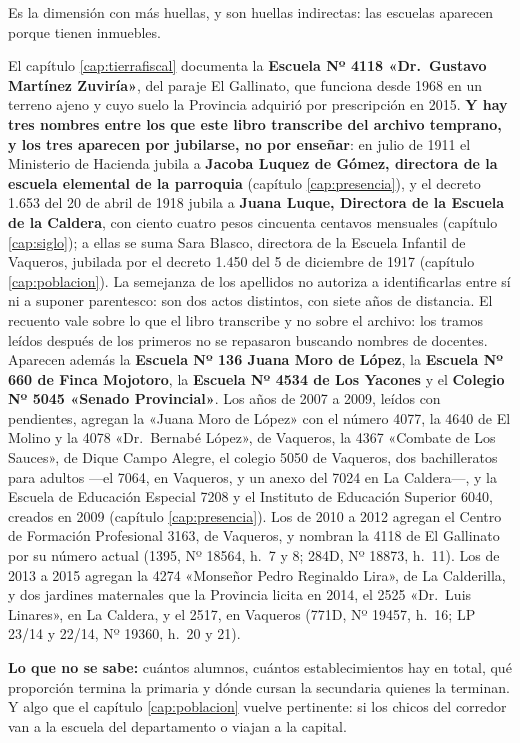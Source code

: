 Es la dimensión con más huellas, y son huellas indirectas: las escuelas aparecen porque tienen
inmuebles.

El capítulo \ref{cap:tierrafiscal} documenta la \textbf{Escuela Nº 4118 «Dr.\ Gustavo Martínez
Zuviría»}, del paraje El Gallinato, que funciona desde 1968 en un terreno ajeno y cuyo suelo la
Provincia adquirió por prescripción en 2015. \textbf{Y hay tres nombres entre los que este libro transcribe del archivo temprano, y los tres aparecen por jubilarse, no por enseñar}: en julio de 1911 el Ministerio de Hacienda jubila a \textbf{Jacoba Luquez de Gómez, directora de la escuela elemental de la parroquia} (capítulo \ref{cap:presencia}), y el decreto 1.653 del 20 de abril de 1918 jubila a \textbf{Juana Luque, Directora de la Escuela de la Caldera}, con ciento cuatro pesos cincuenta centavos mensuales (capítulo \ref{cap:siglo}); a ellas se suma Sara Blasco, directora de la Escuela Infantil de Vaqueros, jubilada por el decreto 1.450 del 5 de diciembre de 1917 (capítulo \ref{cap:poblacion}). La semejanza de los apellidos no autoriza a identificarlas entre sí ni a suponer parentesco: son dos actos distintos, con siete años de distancia. El recuento vale sobre lo que el libro transcribe y no sobre el archivo: los tramos leídos después de los primeros no se repasaron buscando nombres de docentes. Aparecen además la \textbf{Escuela Nº 136 Juana
Moro de López}, la \textbf{Escuela Nº 660 de Finca Mojotoro}, la \textbf{Escuela Nº 4534 de Los Yacones} y el \textbf{Colegio Nº 5045 «Senado Provincial»}. Los años de 2007 a 2009, leídos con pendientes, agregan la «Juana Moro de López» con el número 4077, la 4640 de El Molino y la 4078 «Dr.\ Bernabé López», de Vaqueros, la 4367 «Combate de Los Sauces», de Dique Campo Alegre, el colegio 5050 de Vaqueros, dos bachilleratos para adultos ---el 7064, en Vaqueros, y un anexo del 7024 en La Caldera---, y la Escuela de Educación Especial 7208 y el Instituto de Educación Superior 6040, creados en 2009 (capítulo \ref{cap:presencia}). Los de 2010 a 2012 agregan el Centro de Formación Profesional 3163, de Vaqueros, y nombran la 4118 de El Gallinato por su número actual (1395, Nº 18564, h.\ 7 y 8; 284D, Nº 18873, h.\ 11). Los de 2013 a 2015 agregan la 4274 «Monseñor Pedro Reginaldo Lira», de La Calderilla, y dos jardines maternales que la Provincia licita en 2014, el 2525 «Dr.\ Luis Linares», en La Caldera, y el 2517, en Vaqueros (771D, Nº 19457, h.\ 16; LP 23/14 y 22/14, Nº 19360, h.\ 20 y 21).

\textbf{Lo que no se sabe:} cuántos alumnos, cuántos establecimientos hay en total, qué
proporción termina la primaria y dónde cursan la secundaria quienes la terminan. Y algo que el
capítulo \ref{cap:poblacion} vuelve pertinente: si los chicos del corredor van a la escuela del
departamento o viajan a la capital.

